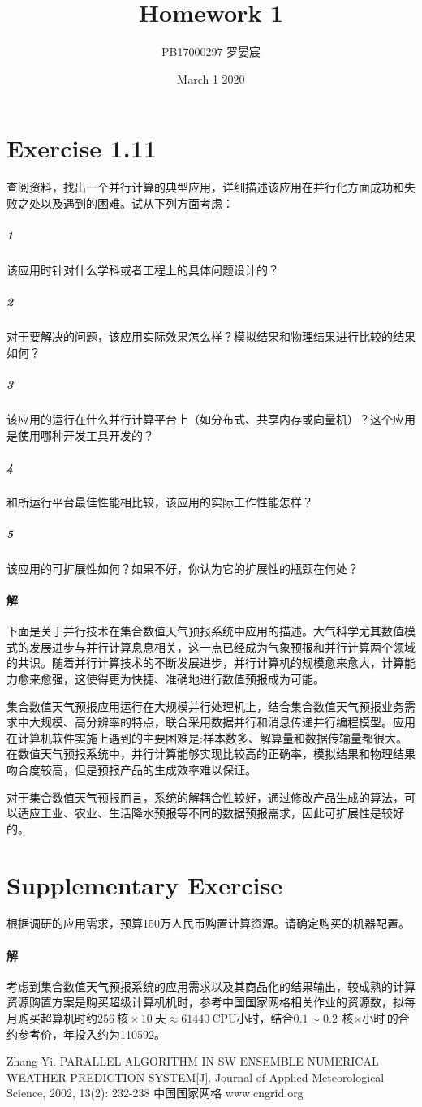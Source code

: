 \documentclass{article}
\title{Homework 1}
\author{PB17000297 罗晏宸}
\date{March 1 2020}
\begin{document}
\maketitle

\section{Exercise 1.11}
查阅资料，找出一个并行计算的典型应用，详细描述该应用在并行化方面成功和失败之处以及遇到的困难。试从下列方面考虑：
\subparagraph{1}该应用时针对什么学科或者工程上的具体问题设计的？
\subparagraph{2}对于要解决的问题，该应用实际效果怎么样？模拟结果和物理结果进行比较的结果如何？
\subparagraph{3}该应用的运行在什么并行计算平台上（如分布式、共享内存或向量机）？这个应用是使用哪种开发工具开发的？
\subparagraph{4}和所运行平台最佳性能相比较，该应用的实际工作性能怎样？
\subparagraph{5}该应用的可扩展性如何？如果不好，你认为它的扩展性的瓶颈在何处？

\paragraph{解}
下面是关于并行技术在集合数值天气预报系统中应用的描述。大气科学尤其数值模式的发展进步与并行计算息息相关，这一点已经成为气象预报和并行计算两个领域的共识。随着并行计算技术的不断发展进步，并行计算机的规模愈来愈大，计算能力愈来愈强，这使得更为快捷、准确地进行数值预报成为可能。
\par
集合数值天气预报应用运行在大规模并行处理机上，结合集合数值天气预报业务需求中大规模、高分辨率的特点，联合采用数据并行和消息传递并行编程模型。应用在计算机软件实施上遇到的主要困难是:样本数多、解算量和数据传输量都很大\cite{ref1}。在数值天气预报系统中，并行计算能够实现比较高的正确率，模拟结果和物理结果吻合度较高，但是预报产品的生成效率难以保证。
\par
对于集合数值天气预报而言，系统的解耦合性较好，通过修改产品生成的算法，可以适应工业、农业、生活降水预报等不同的数据预报需求，因此可扩展性是较好的。

\section{Supplementary Exercise}
根据调研的应用需求，预算150万人民币购置计算资源。请确定购买的机器配置。

\paragraph{解}
考虑到集合数值天气预报系统的应用需求以及其商品化的结果输出，较成熟的计算资源购置方案是购买超级计算机机时，参考中国国家网格相关作业的资源数，拟每月购买超算机时约$\SI{256}{\text{核}} \times \SI{10}{\text{天}} \approx \SI{61440}{\text{CPU小时}}$，结合$0.1 \sim \SI{0.2}{\text{核}\times\text{小时}}$的合约参考价，年投入约为\SI{110592}{}。

\begin{thebibliography}{99}
    Zhang Yi. PARALLEL ALGORITHM IN SW ENSEMBLE NUMERICAL WEATHER PREDICTION SYSTEM[J]. Journal of Applied Meteorological Science, 2002, 13(2): 232-238
    中国国家网格 www.cngrid.org
\end{thebibliography}
\end{document}
